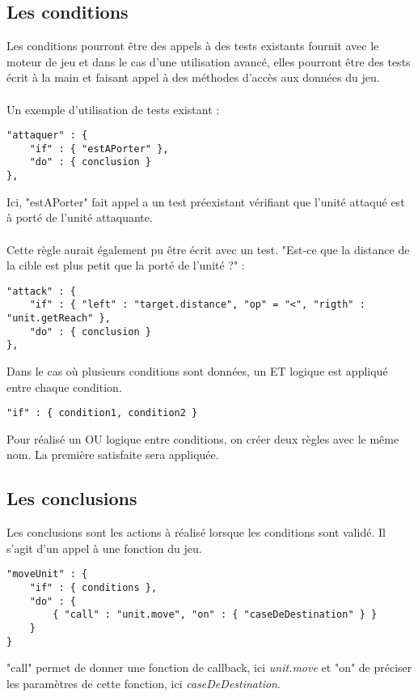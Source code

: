 \documentclass[10pt,a4paper]{article}
\begin{document}
\subsection{Les conditions}

Les conditions pourront être des appels à des tests existants fournit avec le moteur de jeu et dans le cas d'une utilisation avancé, elles pourront être des tests écrit à la main et faisant appel à des méthodes d'accès aux données du jeu.\\
\\
Un exemple d'utilisation de tests existant :

\begin{verbatim}
"attaquer" : {
	"if" : { "estAPorter" },
	"do" : { conclusion }
},
\end{verbatim}

Ici, "estAPorter" fait appel a un test préexistant vérifiant que l'unité attaqué est à porté de l'unité attaquante.\\
\\
Cette règle aurait également pu être écrit avec un test. "Est-ce que la distance de la cible est plus petit que la porté de l'unité ?" :

\begin{verbatim}
"attack" : {
	"if" : { "left" : "target.distance", "op" = "<", "rigth" : "unit.getReach" },
	"do" : { conclusion }
},
\end{verbatim}

Dans le cas où plusieurs conditions sont données, un ET logique est appliqué entre chaque condition.

\begin{verbatim}
"if" : { condition1, condition2 }
\end{verbatim}

Pour réalisé un OU logique entre conditions, on créer deux règles avec le même nom. La première satisfaite sera appliquée.




\subsection{Les conclusions}

Les conclusions sont les actions à réalisé lorsque les conditions sont validé. Il s'agit d'un appel à une fonction du jeu.

\begin{verbatim}
"moveUnit" : {
	"if" : { conditions },
	"do" : {
		{ "call" : "unit.move", "on" : { "caseDeDestination" } }
	}
}
\end{verbatim}

"call" permet de donner une fonction de callback, ici \textit{unit.move} et "on" de préciser les paramètres de cette fonction, ici \textit{caseDeDestination}.
\end{document}
